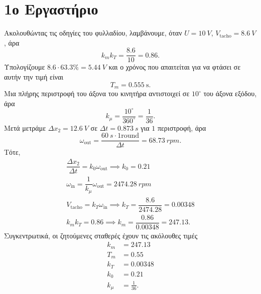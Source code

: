 \documentclass[12pt]{article}
\begin{document}
\section*{1ο Εργαστήριο} 
Ακολουθώντας τις οδηγίες του φυλλαδίου, λαμβάνουμε, όταν \(U = \SI{10}{V}\), \(V_\textrm{tacho} = \SI{8.6}{V }\), άρα 
\begin{equation*}
    k_m k_T = \dfrac{8.6}{10} = 0.86.
\end{equation*} 
Υπολογίζουμε \(8.6 \cdot 63.3\% = \SI{5.44}{V}\) και ο χρόνος που απαιτείται για να φτάσει σε αυτήν την τιμή είναι 
\begin{equation*}
    T_m = \SI{0.555}{\second}.
\end{equation*} 
Μια πλήρης περιστροφή του άξονα του κινητήρα αντιστοιχεί σε \(10^{\circ}\) του άξονα εξόδου, άρα 
\begin{equation*}
    k_\mu = \dfrac{10^\circ }{360^\circ} = \dfrac{1}{36}.
\end{equation*} 
Μετά μετράμε \(\Delta x_2 = \SI{12.6}{V }\) σε \(\Delta t = \SI{0.873}{s }\) για \(1\) περιστροφή, άρα
\begin{equation*}
    \omega_{\text{out}} = \dfrac{\SI{60}{s } \cdot 1 \text{round}}{\Delta t } = \SI{68.73}{rpm }.
\end{equation*} 
Tότε,  
\begin{gather*}
    \dfrac{\Delta x_2}{\Delta t} = k_0 \omega_{\text{out}} \implies k_0 = 0.21 \\
    \omega_\text{in} = \dfrac{1}{k_\mu} \omega_\text{out} = \SI{2474.28}{rpm} \\
    V_\text{tacho} = k_T \omega_\text{in} \implies k_T = \dfrac{8.6}{2474.28} = 0.00348 \\ 
    k_m k_T = 0.86 \implies k_m = \dfrac{0.86}{0.00348} = 247.13.
\end{gather*} 
Συγκεντρωτικά, οι ζητούμενες σταθερές έχουν τις ακόλουθες τιμές
\begin{align*}
        k_m &= 247.13 \\
        T_m &= 0.55 \\
        k_T &= 0.00348 \\
        k_0 &= 0.21 \\
        k_{\mu} &= \frac{1}{36}.
\end{align*} 
\end{document}
